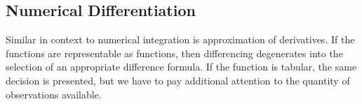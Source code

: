 \subsection{Numerical Differentiation}
Similar in context to numerical integration is approximation of derivatives.   
If the functions are representable as functions, then differencing degenerates into the selection of an appropriate difference formula.
If the function is tabular, the same decision is presented, but we have to pay additional attention to the quantity of observations available.

